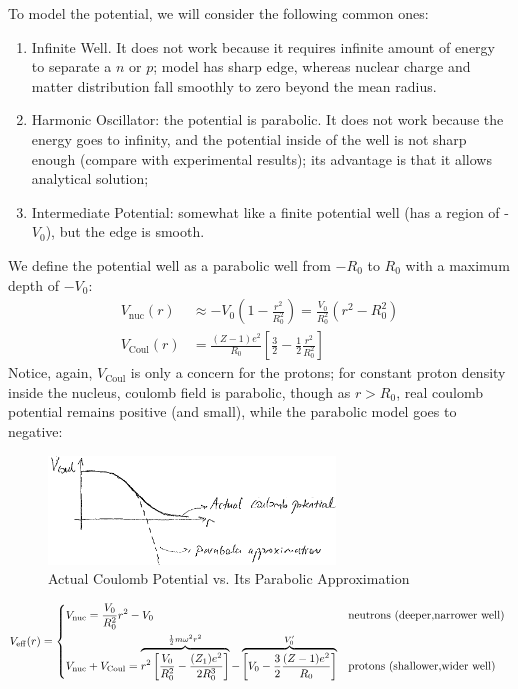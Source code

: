 \documentclass{school-22.101-notes}
\begin{document}
To model the potential, we will consider the following common ones: 
\begin{enumerate}
\item Infinite Well. It does not work because it requires infinite amount of energy to separate a $n$ or $p$; model has sharp edge, whereas nuclear charge and matter distribution fall smoothly to zero beyond the mean radius.
\item Harmonic Oscillator: the potential is parabolic. It does not work because the energy goes to infinity, and the potential inside of the well is not sharp enough (compare with experimental results); its advantage is that it allows analytical solution;
\item Intermediate Potential: somewhat like a finite potential well (has a region of -$V_0$), but the edge is smooth. 
\end{enumerate}



We define the potential well as a parabolic well from $-R_0$ to $R_0$ with a maximum depth of $-V_0$: 
\begin{align}
V_{\mathrm{nuc}} (r) &\approx - V_0 \left( 1 - \frac{r^2}{R_0^2} \right) = \frac{V_0}{R_0^2} (r^2 - R_0^2)  \\
V_{\mathrm{Coul}} (r) &= \frac{(Z-1) e^2}{R_0} \left[ \frac{3}{2} - \frac{1}{2}  \frac{r^2}{R_0^2}\right] 
\end{align}
Notice, again, $V_{\mathrm{Coul}}$ is only a concern for the protons; for constant proton density inside the nucleus, coulomb field is parabolic, though as $r > R_0$, real coulomb potential remains positive (and small), while the parabolic model goes to negative: 

\begin{figure}[h!]
    \centering
    \includegraphics[width=3in]{images/shell/Vcoul-parabolic-model.png}
    \caption{Actual Coulomb Potential vs. Its Parabolic Approximation}
\end{figure}

\begin{align}
V_{\mathrm{eff}} (r) = 
\begin{dcases*}
V_{\mathrm{nuc}}  = \frac{V_0}{R_0^2} r^2 - V_0 
& neutrons (deeper,narrower well) \\
V_{\mathrm{nuc}} + V_{\mathrm{Coul}} = \overbrace{ r^2 \left[ \frac{V_0}{R_0^2} - \frac{(Z_1)e^2}{2 R_0^3} \right] }^{\frac{1}{2} m \omega^2 r^2} - \overbrace{ \left[  V_0 - \frac{3}{2} \frac{(Z-1) e^2}{R_0} \right] }^{V_0^{\prime} }   & protons (shallower,wider well) 
\end{dcases*}
\end{align}
\end{document}
